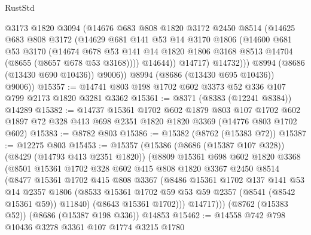 \begin{lexlean}{RustStd}
\begin{coremodule}
                  @3173
                  @1820
                  @3094
                  (@14676
                    @683
                    @808
                    @1820
                    @3172
                    @2450
                    @8514
                    (@14625
                      @683
                      @808
                      @3172
                      (@14629
                        @681
                        @141
                        @53
                        @14
                        @3170
                        @1806
                        (@14600
                          @681
                          @53
                          @3170
                          (@14674
                            @678
                            @53
                            @141
                            @14
                            @1820
                            @1806
                            @3168
                            @8513
                            @14704
                            (@8655 (@8657 @678 @53 @3168))))
                        @14644))
                    @14717)
                  @14732)))
            @8994
            (@8686 (@13430 @690 @10436))
            @9006))
        @8994
        (@8686 (@13430 @695 @10436))
        @9006))
@15357 := @14741 @803 @198 @1702 @602 @3373 @52 @336 @107 @799 @2173 @1820 @3281 @3362
@15361 := @8371 (@8383 (@12241 @8384)) @14289
@15382 := @14737
    @15361
    @1702
    @602
    @1879
    @803
    @107
    @1702
    @602
    @1897
    @72
    @328
    @413
    @698
    @2351
    @1820
    @1820
    @3369
    (@14776 @803 @1702 @602)
@15383 := @8782 @803
@15386 := @15382 (@8762 (@15383 @72))
@15387 := @12275 @803
@15453 := @15357
    (@15386
      (@8686 (@15387 @107 @328))
      (@8429 (@14793 @413 @2351 @1820))
      (@8809
        @15361
        @698
        @602
        @1820
        @3368
        (@8501
          @15361
          @1702
          @328
          @602
          @415
          @808
          @1820
          @3367
          @2450
          @8514
          (@8477
            @15361
            @1702
            @415
            @808
            @3367
            (@8486
              @15361
              @1702
              @137
              @141
              @53
              @14
              @2357
              @1806
              (@8533 @15361 @1702 @59 @53 @59 @2357 (@8541 (@8542 @15361 @59)) @11840)
              (@8643 @15361 @1702)))
          @14717)))
    (@8762 (@15383 @52))
    (@8686 (@15387 @198 @336))
    @14853
@15462 := @14558 @742 @798 @10436 @3278 @3361 @107 @1774 @3215 @1780

\end{coremodule}
\end{lexlean}
